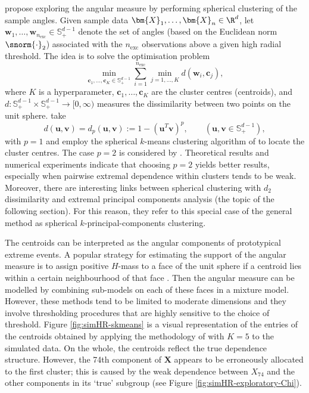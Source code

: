 \documentclass[en-GB, a4paper, nobind]{templates/bathreport}
\begin{document}
\textcite{chautruDimensionReductionMultivariate2015} propose exploring the angular measure by performing spherical clustering of the sample angles. Given sample data \(\bm{X}_1,\ldots,\bm{X}_{n}\in\R^d\), let \(\bm{w}_1,\ldots,\bm{w}_{n_{\text{exc}}}\in\mathbb{S}_+^{d-1}\) denote the set of angles (based on the Euclidean norm \(\snorm{\cdot}_2\)) associated with the \(n_{\text{exc}}\) observations above a given high radial threshold. The idea is to solve the optimisation problem
\begin{equation}
\min_{\bm{c}_1,\ldots,\bm{c}_K\in\mathbb{S}_+^{d-1}} \sum_{i=1}^{n_{\text{exc}}} \min_{j=1,\ldots,K} d(\bm{w}_i,\bm{c}_j),
\label{eq:clustering-optimisation}
\end{equation}
where \(K\) is a hyperparameter, \(\bm{c}_1,\ldots,\bm{c}_K\) are the cluster centres (centroids), and \(d:\mathbb{S}_+^{d-1}\times\mathbb{S}_+^{d-1}\to[0,\infty)\) measures the dissimilarity between two points on the unit sphere. \textcite{janssenKmeansClusteringExtremes2020} take
\begin{equation}
d(\bm{u},\bm{v})=d_p(\bm{u},\bm{v}):=1-(\bm{u}^T\bm{v})^p,\qquad (\bm{u},\bm{v}\in\mathbb{S}_+^{d-1}),
\label{eq:clustering-dp}
\end{equation}
with \(p=1\) and employ the spherical \(k\)-means clustering algorithm of \textcite{dhillonConceptDecompositionsLarge2001} to locate the cluster centres. The case \(p=2\) is considered by \textcite{fomichovDetectionGroupsConcomitant2020}. Theoretical results and numerical experiments indicate that choosing \(p=2\) yields better results, especially when pairwise extremal dependence within clusters tends to be weak. Moreover, there are interesting links between spherical clustering with \(d_2\) dissimilarity and extremal principal components analysis (the topic of the following section). For this reason, they refer to this special case of the general method as spherical \(k\)-principal-components clustering.

The centroids can be interpreted as the angular components of prototypical extreme events. A popular strategy for estimating the support of the angular measure is to assign positive \(H\)-mass to a face of the unit sphere if a centroid lies within a certain neighbourhood of that face \autocite{chiapinoFeatureClusteringExtreme2017,goixSparseRepresentationMultivariate2017,simpsonDeterminingDependenceStructure2019,chiapinoIdentifyingGroupsVariables2018,meyerSparseRegularVariation2021}. Then the angular measure can be modelled by combining sub-models on each of these faces in a mixture model. However, these methods tend to be limited to moderate dimensions and they involve thresholding procedures that are highly sensitive to the choice of threshold. Figure \ref{fig:simHR-skmeans} is a visual representation of the entries of the centroids obtained by applying the methodology of \textcite{janssenKmeansClusteringExtremes2020} with \(K=5\) to the simulated data. On the whole, the centroids reflect the true dependence structure. However, the 74th component of \(\bm{X}\) appears to be erroneously allocated to the first cluster; this is caused by the weak dependence between \(X_{74}\) and the other components in its `true' subgroup (see Figure \ref{fig:simHR-exploratory-Chi}).
\end{document}
